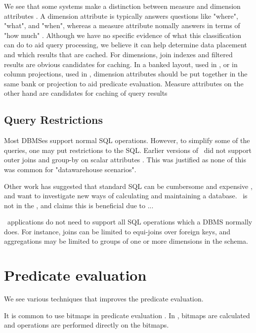 We see that some systems make a distinction between measure and dimension attributes \cite{Kamkolkar2015-iq, Johnson2008-cp}. A dimension attribute is typically answers questions like "where", "what", and "when", whereas a measure attribute nomally answers in terms of "how much" \cite{noauthor_undated-es}. Although we have no specific evidence of what this classification can do to aid query processing, we believe it can help determine data placement and which results that are cached. For dimensions, join indexes and filtered results are obvious candidates for caching. In a banked layout, used in \blink, or in column projections, used in \cstore, dimension attributes should be put together in the same bank or projection to aid predicate evaluation. Measure attributes on the other hand are candidates for caching of query results

\subsection{Query Restrictions}
\label{sub:Query Restrictions}
Most DBMSes support normal SQL operations. However, to simplify some of the queries, one may put restrictions to the SQL. Earlier versions of \mssql~did not support outer joins and group-by on scalar attributes \cite{Larson2013-mc}. This was justified as none of this was common for "datawarehouse scenarios".

Other work has suggested that standard SQL can be cumbersome and expensive \cite{Plattner2014-fr}, and want to investigate new ways of calculating and maintaining a database. \qlikview~is not in the , and claims this is beneficial due to ... 

\bd~applications do not need to support all SQL operations which a DBMS normally does. For instance, joins can be limited to equi-joins over foreign keys, and aggregations may be limited to groups of one or more dimensions in the schema.

\section{Predicate evaluation}
\label{sec:Predicate evaluation}
We see various techniques that improves the predicate evaluation.

It is common to use bitmaps in predicate evaluation \cite{Raman2008-gi, Raman2013-em}. In \blink, bitmaps are calculated and operations are performed directly on the bitmaps.

